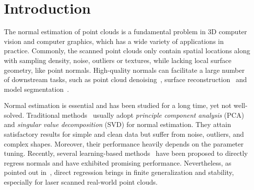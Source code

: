 \documentclass[runningheads]{llncs}
\begin{document}
\section{Introduction}\label{sec:intro}
The normal estimation of point clouds is a fundamental problem in 3D computer vision and computer graphics, which has a wide variety of applications in practice. Commonly, the scanned point clouds only contain spatial locations along with sampling density, noise, outliers or textures, while lacking local surface geometry, like point normals. High-quality normals can facilitate a large number of downstream tasks, such as point cloud denoising~\cite{lu2020low,lu2020deep}, surface reconstruction~\cite{kazhdan2006poisson,fleishman2005robust} and model segmentation~\cite{che2018multi}. 

Normal estimation is essential and has been studied for a long time, yet not well-solved. Traditional methods~\cite{hoppe1992surface,levin1998approximation,cazals2005estimating,boulch2012fast} usually adopt \emph{principle component analysis} (PCA) and \emph{singular value decomposition} (SVD) for normal estimation. They attain satisfactory results for simple and clean data but suffer from noise, outliers, and complex shapes. Moreover, their performance heavily depends on the parameter tuning. Recently, several learning-based methods~\cite{guerrero2018pcpnet,ben2019nesti,zhou2020geometry,wang2020neighbourhood,hashimoto2019normal}  have been proposed to directly regress normals and have exhibited promising performance. Nevertheless, as pointed out in~\cite{zhu2021adafit}, direct regression brings in finite generalization and stability, especially for laser scanned real-world point clouds. 
\end{document}
